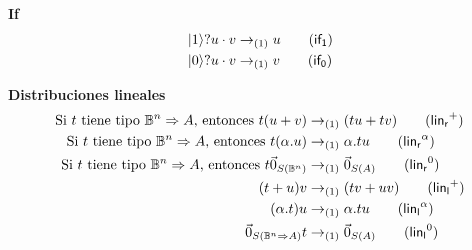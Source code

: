 \textbf{If}
\begin{align*}
	\ifte{\ket{1}}{u}{v} & \reducesto_{(1)} u \tag{\( \mathsf{if_1} \)} \\
	\ifte{\ket{0}}{u}{v} & \reducesto_{(1)} v \tag{\( \mathsf{if_0} \)}
\end{align*}

\textbf{Distribuciones lineales}
\begin{align*}
	\text{Si } t \text{ tiene tipo } \qubittype^n \Rightarrow A \text{, entonces } \app{t}{(u + v)}                & \reducesto_{(1)} (\app{t}{u} + \app{t}{v}) \tag{\( \mathsf{lin_r}^+ \)} \\
	\text{Si } t \text{ tiene tipo } \qubittype^n \Rightarrow A \text{, entonces } \app{t}{(\alpha . u)}           & \reducesto_{(1)} \alpha . \app{t}{u} \tag{\( \mathsf{lin_r}^\alpha \)}  \\
	\text{Si } t \text{ tiene tipo } \qubittype^n \Rightarrow A \text{, entonces } \app{t}{\nullvec{\qubittype^n}} & \reducesto_{(1)} \nullvec{A} \tag{\( \mathsf{lin_r}^0 \)}               \\
	\app{(t + u)}{v}                                                                                               & \reducesto_{(1)} (\app{t}{v} + \app{u}{v}) \tag{\( \mathsf{lin_l}^+ \)} \\
	\app{(\alpha . t)}{u}                                                                                          & \reducesto_{(1)} \alpha . \app{t}{u} \tag{\( \mathsf{lin_l}^\alpha \)}  \\
	\app{\nullvec{\qubittype^n \Rightarrow A}}{t}                                                                  & \reducesto_{(1)} \nullvec{A} \tag{\( \mathsf{lin_l}^0 \)}
\end{align*}

